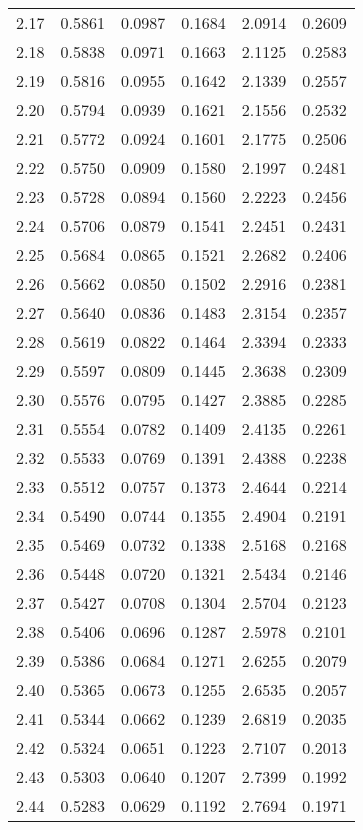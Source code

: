 \documentclass{article}
\begin{document}
\begin{longtable}{cccccc}
2.17 & 0.5861 & 0.0987 & 0.1684 & 2.0914 & 0.2609 \\
2.18 & 0.5838 & 0.0971 & 0.1663 & 2.1125 & 0.2583 \\
2.19 & 0.5816 & 0.0955 & 0.1642 & 2.1339 & 0.2557 \\
2.20 & 0.5794 & 0.0939 & 0.1621 & 2.1556 & 0.2532 \\
2.21 & 0.5772 & 0.0924 & 0.1601 & 2.1775 & 0.2506 \\
2.22 & 0.5750 & 0.0909 & 0.1580 & 2.1997 & 0.2481 \\
2.23 & 0.5728 & 0.0894 & 0.1560 & 2.2223 & 0.2456 \\
2.24 & 0.5706 & 0.0879 & 0.1541 & 2.2451 & 0.2431 \\
2.25 & 0.5684 & 0.0865 & 0.1521 & 2.2682 & 0.2406 \\
2.26 & 0.5662 & 0.0850 & 0.1502 & 2.2916 & 0.2381 \\
2.27 & 0.5640 & 0.0836 & 0.1483 & 2.3154 & 0.2357 \\
2.28 & 0.5619 & 0.0822 & 0.1464 & 2.3394 & 0.2333 \\
2.29 & 0.5597 & 0.0809 & 0.1445 & 2.3638 & 0.2309 \\
2.30 & 0.5576 & 0.0795 & 0.1427 & 2.3885 & 0.2285 \\
2.31 & 0.5554 & 0.0782 & 0.1409 & 2.4135 & 0.2261 \\
2.32 & 0.5533 & 0.0769 & 0.1391 & 2.4388 & 0.2238 \\
2.33 & 0.5512 & 0.0757 & 0.1373 & 2.4644 & 0.2214 \\
2.34 & 0.5490 & 0.0744 & 0.1355 & 2.4904 & 0.2191 \\
2.35 & 0.5469 & 0.0732 & 0.1338 & 2.5168 & 0.2168 \\
2.36 & 0.5448 & 0.0720 & 0.1321 & 2.5434 & 0.2146 \\
2.37 & 0.5427 & 0.0708 & 0.1304 & 2.5704 & 0.2123 \\
2.38 & 0.5406 & 0.0696 & 0.1287 & 2.5978 & 0.2101 \\
2.39 & 0.5386 & 0.0684 & 0.1271 & 2.6255 & 0.2079 \\
2.40 & 0.5365 & 0.0673 & 0.1255 & 2.6535 & 0.2057 \\
2.41 & 0.5344 & 0.0662 & 0.1239 & 2.6819 & 0.2035 \\
2.42 & 0.5324 & 0.0651 & 0.1223 & 2.7107 & 0.2013 \\
2.43 & 0.5303 & 0.0640 & 0.1207 & 2.7399 & 0.1992 \\
2.44 & 0.5283 & 0.0629 & 0.1192 & 2.7694 & 0.1971 \\

\end{longtable}
\end{document}
